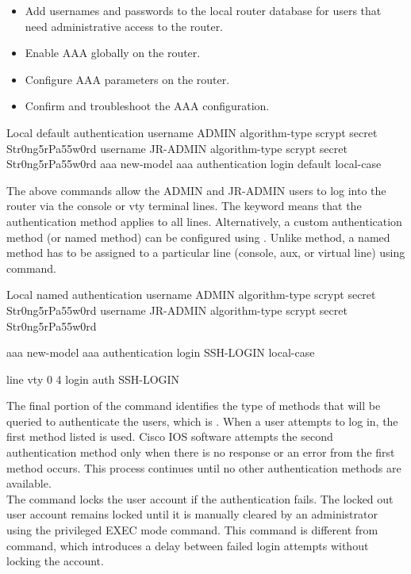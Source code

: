 \begin{itemize}
  \item Add usernames and passwords to the local router database for users that need administrative access to the router.
  \item Enable AAA globally on the router.
  \item Configure AAA parameters on the router.
  \item Confirm and troubleshoot the AAA configuration.  
\end{itemize}

\begin{sexylisting}{Local default authentication}
username ADMIN algorithm-type scrypt secret Str0ng5rPa55w0rd
username JR-ADMIN algorithm-type scrypt secret Str0ng5rPa55w0rd
aaa new-model
aaa authentication login default local-case
\end{sexylisting}

The above commands allow the ADMIN and JR-ADMIN users to log into the router via the console or vty terminal lines. The  keyword means that the authentication method applies to all lines. Alternatively, a custom authentication method (or named method) can be configured using . Unlike  method, a named method has to be assigned to a particular line (console, aux, or virtual line) using  command.\\ 

\begin{sexylisting}{Local named authentication}
  username ADMIN algorithm-type scrypt secret Str0ng5rPa55w0rd
  username JR-ADMIN algorithm-type scrypt secret Str0ng5rPa55w0rd
  
  aaa new-model
  aaa authentication login SSH-LOGIN local-case
  
  line vty 0 4
  login auth SSH-LOGIN
  \end{sexylisting}

The final portion of the  command identifies the type of methods that will be queried to authenticate the users, which is . When a user attempts to log in, the first method listed is used. Cisco IOS software attempts the second authentication method only when there is no response or an error from the first method occurs. This process continues until no other authentication methods are available.\\

The  command locks the user account if the authentication fails. The locked out user account remains locked until it is manually cleared by an administrator using the  privileged EXEC mode command. This command is different from  command, which introduces a delay between failed login attempts without locking the account.\\

